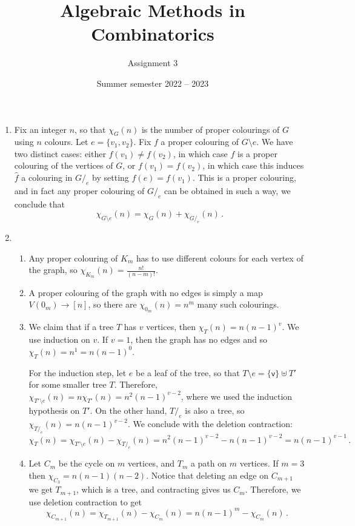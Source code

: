 \documentclass[kulak]{tplt}
\title{Algebraic Methods in Combinatorics}
\author{Assignment 3}
\date{Summer semester 2022 -- 2023}
\theoremstyle{definition}
\newcommand{\vv}{\mathsf{v}}
\begin{document}
\maketitle
\begin{enumerate}
\item 
Fix an integer $n$, so that $\chi_G(n)$ is the number of proper colourings of $G$ using $n$ colours.
Let $e = \{v_1, v_2\}$.
Fix $f$ a proper colouring of $G\setminus e$.
We have two distinct cases: either $f(v_1) \neq f(v_2)$, in which case $f$ is a proper colouring of the vertices of $G$, or $f(v_1) = f(v_2)$, in which case this induces $\hat{f}$ a colouring in $G/_e$ by setting $f(e) = f(v_1)$.
This is a proper colouring, and in fact any proper colouring of $G/_e$ can be obtained in such a way, we conclude that 
$$ \chi_{G\setminus e }(n) = \chi_G(n) + \chi_{G/_e}(n)\, . $$

\item 
\begin{enumerate}
\item 
Any proper colouring of $K_m$ has to use different colours for each vertex of the graph, so $\chi_{K_m}(n) = \frac{n!}{(n-m)!}$.

\item 
A proper colouring of the graph with no edges is simply a map $V(0_m) \to [n]$, so there are $\chi_{0_m}(n) = n^m$ many such colourings.


\item 
We claim that if a tree $T$ has $v$ vertices, then $\chi_T(n) = n(n-1)^v$.
We use induction on $v$.
If $v=1$, then the graph has no edges and so $\chi_T(n) = n^1 = n (n-1)^0$.

For the induction step, let $e$ be a leaf of the tree, so that $T\setminus e = \{\vv\} \uplus T'$ for some smaller tree $T$.
Therefore, $\chi_{T'\setminus e}(n) = n \chi_{T'}(n) = n^2(n-1)^{v-2}$, where we used the induction hypothesis on $T'$.
On the other hand, $T/_e$ is also a tree, so $\chi_{T/_e}(n) = n (n-1)^{v-2}$.
We conclude with the deletion contraction:
$$\chi_T(n) = \chi_{T'\setminus e}(n) - \chi_{T/_e}(n) = n^2(n-1)^{v-2}  - n(n-1)^{v-2} = n(n-1)^{v-1} \, .  $$


\item 
Let $C_m$ be the cycle on $m$ vertices, and $T_m$ a path on $m$ vertices.
If $m=3$ then $\chi_{C_3} = n(n-1)(n-2)$.
Notice that deleting an edge on $C_{m+1}$ we get $T_{m+1}$, which is a tree, and contracting gives us $C_m$.
Therefore, we use deletion contraction to get 
$$\chi_{C_{m+1}}(n) =  \chi_{T_{m+1}}(n) - \chi_{C_m}(n) =  n(n-1)^m - \chi_{C_m}(n) \, . $$


\end{enumerate}
\end{enumerate}
\end{document}
